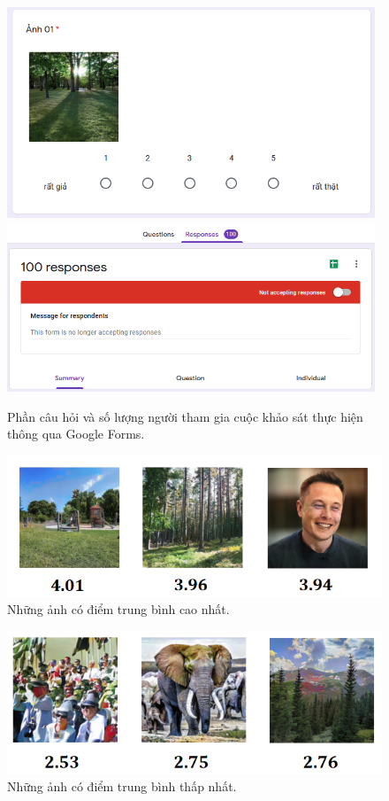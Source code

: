 \documentclass[a4paper, 12pt]{report}
\begin{document}
\begin{figure}[!h]
\captionsetup{width=0.8\textwidth}
\centering
\includegraphics[width=11cm]{images/question2.PNG}
\includegraphics[width=11cm]{images/question3.PNG}
\caption[Phần câu hỏi và số lượng người tham gia cuộc khảo sát thực hiện thông qua Google Forms.]{Phần câu hỏi và số lượng người tham gia cuộc khảo sát thực hiện thông qua Google Forms\protect\footnotemark.}
\label{fig:questionsurvey}
\end{figure}

\begin{figure}[!h]
\captionsetup{width=0.8\textwidth}
\centering
\includegraphics[width=11.8cm]{images/best.PNG}
\caption{Những ảnh có điểm trung bình cao nhất.}
\label{fig:besttests}
\end{figure}

\begin{figure}[!h]
\captionsetup{width=0.8\textwidth}
\centering
\includegraphics[width=11.8cm]{images/worst.PNG}
\caption{Những ảnh có điểm trung bình thấp nhất.}
\label{fig:worsttests}
\end{figure}
\end{document}
